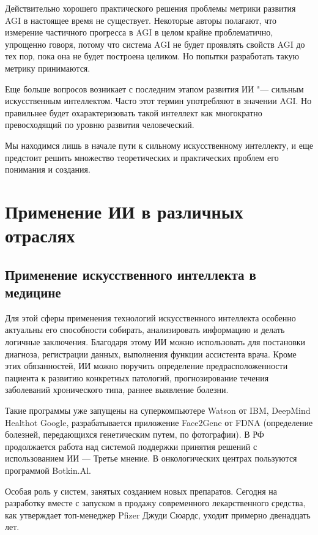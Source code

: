 \documentclass[bachelor,och,referat]{SCWorks_corrected}
\begin{document}
Действительно хорошего практического решения проблемы метрики развития AGI в настоящее время не существует. Некоторые авторы полагают, что измерение частичного прогресса в AGI в целом крайне проблематично, упрощенно говоря, потому что система AGI не будет проявлять свойств AGI до тех пор, пока она не будет построена целиком. Но попытки разработать такую метрику принимаются. 

Еще больше вопросов возникает с последним этапом развития ИИ "--- сильным искусственным интеллектом. Часто этот термин употребляют в значении AGI. Но правильнее будет охарактеризовать такой интеллект как многократно превосходящий по уровню развития человеческий. 

Мы находимся лишь в начале пути к сильному искусственному интеллекту, и еще предстоит решить множество теоретических и практических проблем его понимания и создания.

\section{Применение ИИ в различных отраслях}

\subsection{Применение искусственного интеллекта в медицине}
    
Для этой сферы применения технологий искусственного интеллекта особенно актуальны его способности собирать, анализировать информацию и делать логичные заключения. Благодаря этому ИИ можно использовать для постановки диагноза, регистрации данных, выполнения функции ассистента врача. Кроме этих обязанностей, ИИ можно поручить определение предрасположенности пациента к развитию конкретных патологий, прогнозирование течения заболеваний хронического типа, раннее выявление болезни.\cite{N4}

Такие программы уже запущены на суперкомпьютере Watson от IBM, DeepMind Healthot Google, разрабатывается приложение Face2Gene от FDNA (определение болезней, передающихся генетическим путем, по фотографии). В РФ продолжается работа над системой поддержки принятия решений с использованием ИИ --- Третье мнение. В онкологических центрах пользуются программой Botkin.Al.

Особая роль у систем, занятых созданием новых препаратов. Сегодня на разработку вместе с запуском в продажу современного лекарственного средства, как утверждает топ-менеджер Pfizer Джуди Сюардс, уходит примерно двенадцать лет.
\end{document}
